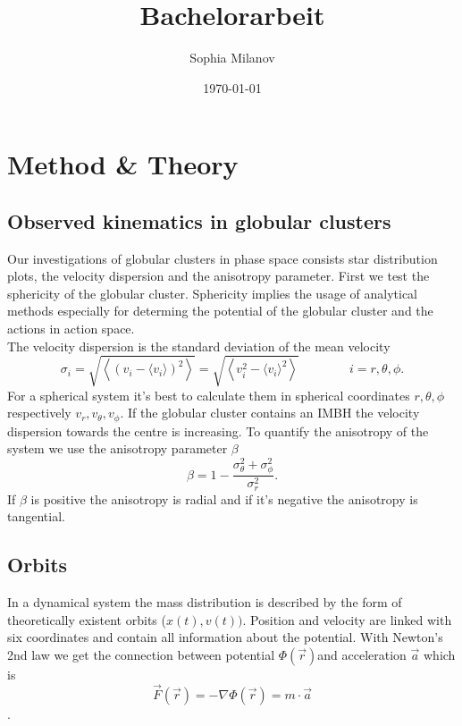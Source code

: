 \documentclass[a4paper,12pt,abstracton]{scrartcl}
\title{Bachelorarbeit}
\author{Sophia Milanov}
\date{\today}
\begin{document}
\onehalfspacing


\begin{abstract}
\blindtext 
\end{abstract}

\newpage

\tableofcontents

\newpage




\newpage
\section{Method \& Theory}
\subsection{Observed kinematics in globular clusters}
Our investigations of globular clusters in phase space consists star distribution plots, the velocity dispersion and the anisotropy parameter. First we test the sphericity of the globular cluster. Sphericity implies the usage of analytical methods especially for determing the potential of the globular cluster and the actions in action space. \\ The velocity dispersion is the standard deviation of the mean velocity \[\sigma_i=\sqrt{\left\langle(v_i-\langle v_i\rangle)^2\right\rangle}=\sqrt{\left\langle v_i^2-\langle v_i\rangle^2\right\rangle} \qquad\qquad i=r,\theta,\phi.\] For a spherical system it's best to calculate them in spherical coordinates \(r,\theta,\phi\) respectively \(v_r,v_{\theta},v_{\phi}\). If the globular cluster contains an IMBH the velocity dispersion towards the centre is increasing. To quantify the anisotropy of the system we use the anisotropy parameter \(\beta\) \[\beta=1-\frac{\sigma_\theta ^2+\sigma_\phi ^2}{\sigma_r ^2}.\] If \(\beta\) is positive the anisotropy is radial and if it's negative the anisotropy is tangential.

\subsection{Orbits}
In a dynamical system the mass distribution is described by the form of theoretically existent orbits (\(x(t),v(t))\). Position and velocity are linked with six coordinates and contain all information about the potential. With Newton's 2nd law we get the connection between potential \(\Phi(\vec{r})\)and acceleration \(\vec{a}\) which is \[\vec{F}(\vec{r})=-\nabla\Phi(\vec{r})=m\cdot\vec{a}\]. 
\end{document}
